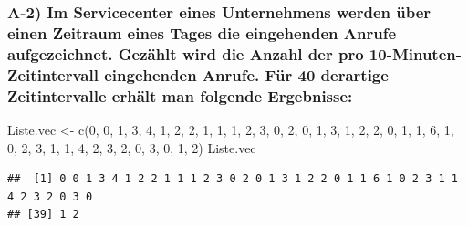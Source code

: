 \documentclass[
]{article}
\newenvironment{Shaded}{\begin{snugshade}}{\end{snugshade}}
\newcommand{\DecValTok}[1]{\textcolor[rgb]{0.00,0.00,0.81}{#1}}
\newcommand{\FunctionTok}[1]{\textcolor[rgb]{0.00,0.00,0.00}{#1}}
\newcommand{\NormalTok}[1]{#1}
\newcommand{\OtherTok}[1]{\textcolor[rgb]{0.56,0.35,0.01}{#1}}
\begin{document}
\hypertarget{a-2-im-servicecenter-eines-unternehmens-werden-uxfcber-einen-zeitraum-eines-tages-die-eingehenden-anrufe-aufgezeichnet.-gezuxe4hlt-wird-die-anzahl-der-pro-10-minuten-zeitintervall-eingehenden-anrufe.-fuxfcr-40-derartige-zeitintervalle-erhuxe4lt-man-folgende-ergebnisse}{%
\subsubsection{A-2) Im Servicecenter eines Unternehmens werden über
einen Zeitraum eines Tages die eingehenden Anrufe aufgezeichnet. Gezählt
wird die Anzahl der pro 10-Minuten-Zeitintervall eingehenden Anrufe. Für
40 derartige Zeitintervalle erhält man folgende
Ergebnisse:}\label{a-2-im-servicecenter-eines-unternehmens-werden-uxfcber-einen-zeitraum-eines-tages-die-eingehenden-anrufe-aufgezeichnet.-gezuxe4hlt-wird-die-anzahl-der-pro-10-minuten-zeitintervall-eingehenden-anrufe.-fuxfcr-40-derartige-zeitintervalle-erhuxe4lt-man-folgende-ergebnisse}}

\begin{Shaded}
\begin{Highlighting}[]
\NormalTok{Liste.vec }\OtherTok{\textless{}{-}} \FunctionTok{c}\NormalTok{(}\DecValTok{0}\NormalTok{, }\DecValTok{0}\NormalTok{, }\DecValTok{1}\NormalTok{, }\DecValTok{3}\NormalTok{, }\DecValTok{4}\NormalTok{, }\DecValTok{1}\NormalTok{, }\DecValTok{2}\NormalTok{, }\DecValTok{2}\NormalTok{, }\DecValTok{1}\NormalTok{, }\DecValTok{1}\NormalTok{, }\DecValTok{1}\NormalTok{, }\DecValTok{2}\NormalTok{, }\DecValTok{3}\NormalTok{, }\DecValTok{0}\NormalTok{, }\DecValTok{2}\NormalTok{, }\DecValTok{0}\NormalTok{, }\DecValTok{1}\NormalTok{, }\DecValTok{3}\NormalTok{, }\DecValTok{1}\NormalTok{, }\DecValTok{2}\NormalTok{, }\DecValTok{2}\NormalTok{, }\DecValTok{0}\NormalTok{, }\DecValTok{1}\NormalTok{, }\DecValTok{1}\NormalTok{, }\DecValTok{6}\NormalTok{, }\DecValTok{1}\NormalTok{, }\DecValTok{0}\NormalTok{, }\DecValTok{2}\NormalTok{, }\DecValTok{3}\NormalTok{, }\DecValTok{1}\NormalTok{, }\DecValTok{1}\NormalTok{, }\DecValTok{4}\NormalTok{, }\DecValTok{2}\NormalTok{, }\DecValTok{3}\NormalTok{, }\DecValTok{2}\NormalTok{, }\DecValTok{0}\NormalTok{, }\DecValTok{3}\NormalTok{, }\DecValTok{0}\NormalTok{, }\DecValTok{1}\NormalTok{, }\DecValTok{2}\NormalTok{)}
\NormalTok{Liste.vec}
\end{Highlighting}
\end{Shaded}

\begin{verbatim}
##  [1] 0 0 1 3 4 1 2 2 1 1 1 2 3 0 2 0 1 3 1 2 2 0 1 1 6 1 0 2 3 1 1 4 2 3 2 0 3 0
## [39] 1 2
\end{verbatim}
\end{document}
